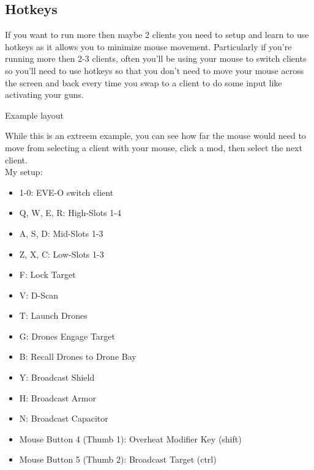 \documentclass{article}
\begin{document}
\clearpage
\subsection{Hotkeys}

If you want to run more then maybe 2 clients you need to setup and learn to use hotkeys as it allows you 
to minimize mouse movement. Particularly if you're running more then 2-3 clients, often you'll be using your
mouse to switch clients so you'll need to use hotkeys so that you don't need to move your mouse across the
screen and back every time you swap to a client to do some input like activating your guns.
\\
\begin{center}
Example layout
\end{center}
While this is an extreem example, you can see how far the mouse would need to move from selecting a client with your mouse,
click a mod, then select the next client. \\

\noindent My setup: \\

\begin{itemize}
  \item 1-0: EVE-O switch client
  \item Q, W, E, R: High-Slots 1-4
  \item A, S, D: Mid-Slots 1-3
  \item Z, X, C: Low-Slots 1-3
  \item F: Lock Target\
  \item V: D-Scan
  \item T: Launch Drones
  \item G: Drones Engage Target
  \item B: Recall Drones to Drone Bay
  \item Y: Broadcast Shield
  \item H: Broadcast Armor
  \item N: Broadcast Capacitor
  \item Mouse Button 4 (Thumb 1): Overheat Modifier Key (shift)
  \item Mouse Button 5 (Thumb 2): Broadcast Target (ctrl)
\end{itemize}
\end{document}
